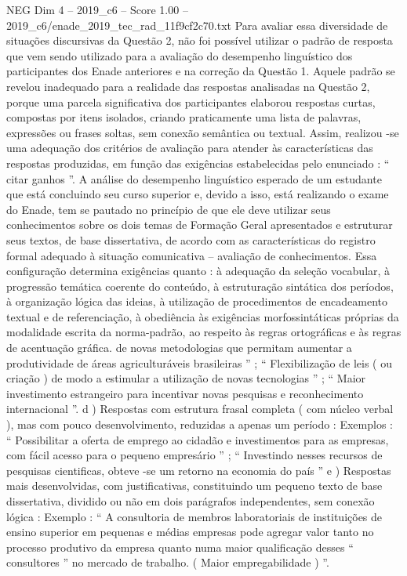 \begin{textsample}{NEG Dim 4 – 2019\_c6 – Score 1.00 – 2019\_c6/enade\_2019\_tec\_rad\_11f9cf2c70.txt}
Para avaliar essa diversidade de situações discursivas da Questão 2, não foi possível utilizar o padrão de resposta que vem sendo utilizado para a avaliação do desempenho linguístico dos participantes dos Enade anteriores e na correção da Questão 1.
Aquele padrão se revelou inadequado para a realidade das respostas analisadas na Questão 2, porque uma parcela significativa dos participantes elaborou respostas curtas, compostas por itens isolados, criando praticamente uma lista de palavras, expressões ou frases soltas, sem conexão semântica ou textual.
Assim, realizou -se uma adequação dos critérios de avaliação para atender às características das respostas produzidas, em função das exigências estabelecidas pelo enunciado : “ citar ganhos ”.
A análise do desempenho linguístico esperado de um estudante que está concluindo seu curso superior e, devido a isso, está realizando o exame do Enade, tem se pautado no princípio de que ele deve utilizar seus conhecimentos sobre os dois temas de Formação Geral apresentados e estruturar seus textos, de base dissertativa, de acordo com as características do registro formal adequado à situação comunicativa – avaliação de conhecimentos.
Essa configuração determina exigências quanto : à adequação da seleção vocabular, à progressão temática coerente do conteúdo, à estruturação sintática dos períodos, à organização lógica das ideias, à utilização de procedimentos de encadeamento textual e de referenciação, à obediência às exigências morfossintáticas próprias da modalidade escrita da norma-padrão, ao respeito às regras ortográficas e às regras de acentuação gráfica. de novas metodologias que permitam aumentar a produtividade de áreas agriculturáveis brasileiras ” ; “ Flexibilização de leis ( ou criação ) de modo a estimular a utilização de novas tecnologias ” ; “ Maior investimento estrangeiro para incentivar novas pesquisas e reconhecimento internacional ”. d ) Respostas com estrutura frasal completa ( com núcleo verbal ), mas com pouco desenvolvimento, reduzidas a apenas um período : Exemplos : “ Possibilitar a oferta de emprego ao cidadão e investimentos para as empresas, com fácil acesso para o pequeno empresário ” ; “ Investindo nesses recursos de pesquisas cientificas, obteve -se um retorno na economia do país ” e ) Respostas mais desenvolvidas, com justificativas, constituindo um pequeno texto de base dissertativa, dividido ou não em dois parágrafos independentes, sem conexão lógica : Exemplo : “ A consultoria de membros laboratoriais de instituições de ensino superior em pequenas e médias empresas pode agregar valor tanto no processo produtivo da empresa quanto numa maior qualificação desses “ consultores ” no mercado de trabalho. ( Maior empregabilidade ) ”.

\end{textsample}
